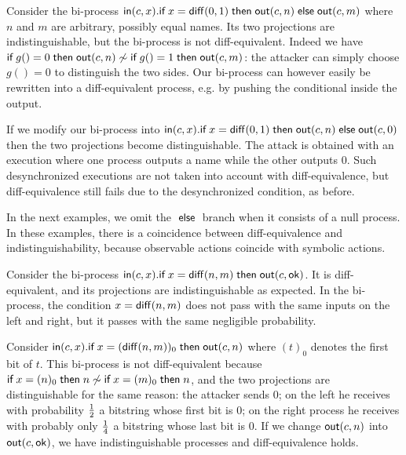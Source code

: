 \begin{example}
  Consider the bi-process
  $\mathsf{in}(c,x).\textsf{if}\; x=\mathsf{diff}(0,1) \;\textsf{then}\; \mathsf{out}(c,n) \;\textsf{else}\; \mathsf{out}(c,m)$
  where $n$ and $m$ are arbitrary, possibly equal names.
  Its two projections are indistinguishable, but the
  bi-process is not diff-equivalent.
  Indeed we have
  $\textsf{if}\; g()=0 \;\textsf{then}\; \mathsf{out}(c,n) \not\sim
   \textsf{if}\; g()=1 \;\textsf{then}\; \mathsf{out}(c,m)$: the attacker can simply choose
  $g()=0$ to distinguish the two sides.
  Our bi-process can however easily be
  rewritten into a diff-equivalent process, e.g. by pushing the conditional
  inside the output.

  If we modify our bi-process into
  $\mathsf{in}(c,x).\textsf{if}\; x=\mathsf{diff}(0,1) \;\textsf{then}\; \mathsf{out}(c,n) \;\textsf{else}\; \mathsf{out}(c,0)$
  then the two projections become distinguishable.
  The attack is obtained with an execution
  where one process outputs a name while the other outputs $0$. Such
  desynchronized executions are not taken into account with diff-equivalence,
  but diff-equivalence still fails due to the desynchronized condition,
  as before.
\end{example}

In the next examples, we omit the $\;\textsf{else}\;$ branch when it consists of a null
process. In these examples, there is a coincidence between diff-equivalence
and indistinguishability, because observable actions coincide with symbolic
actions.

\begin{example} \label{ex:negl}
  Consider the bi-process
  $\mathsf{in}(c,x).\textsf{if}\; x=\mathsf{diff}(n,m) \;\textsf{then}\; \mathsf{out}(c,\mathsf{ok})$.
  It is diff-equivalent, and its projections are
  indistinguishable as expected.
  In the bi-process, the condition $x=\mathsf{diff}(n,m)$ does not pass
  with the same inputs on the left and right, but it passes with
  the same negligible probability.
\end{example}

\begin{example} \label{ex:sync}
  Consider
  $\mathsf{in}(c,x).\textsf{if}\; x=(\mathsf{diff}(n,m))_0 \;\textsf{then}\; \mathsf{out}(c,n)$
  where $(t)_0$ denotes the first bit of $t$.
  This bi-process is not diff-equivalent because
  $\textsf{if}\; x=(n)_0 \;\textsf{then}\; n \not\sim \textsf{if}\; x=(m)_0 \;\textsf{then}\; n$, and
  the two projections are distinguishable for the same
  reason: the attacker sends $0$;
  on the left he receives with probability $1\over 2$ a bitstring whose
  first bit is $0$;
  on the right process he receives with probably only $1\over 4$
  a bitstring whose last bit is $0$.
  If we change $\mathsf{out}(c,n)$ into $\mathsf{out}(c,\mathsf{ok})$,
  we have indistinguishable processes and diff-equivalence holds.
\end{example}

